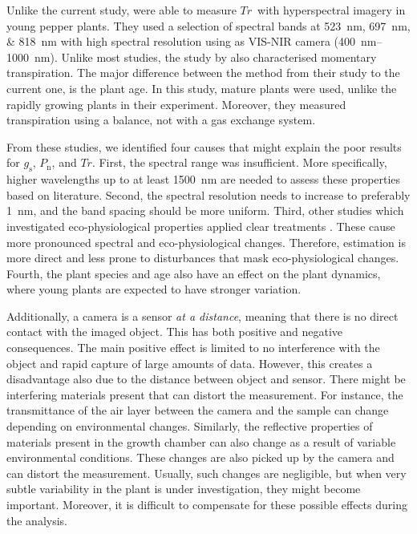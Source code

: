 \documentclass[10pt,authoryear,a4paper]{elsarticle}
\newcommand{\Cond}{$g_\text{s}$}
\newcommand{\Photo}{$P_\text{n}$}
\newcommand{\Transp}{$Tr$}
\begin{document}
    Unlike the current study, \citet{wekslerHyperspectralPhysiological2020} were able to measure \Transp\ with hyperspectral imagery in young pepper plants. They used a selection of spectral bands at \SIlist{523;697;818}{\nano\metre} with high spectral resolution using as VIS-NIR camera (\SIrange{400}{1000}{\nano\metre}). Unlike most studies, the study by \citet{wekslerHyperspectralPhysiological2020} also characterised momentary transpiration. The major difference between the method from their study to the current one, is the plant age. In this study, mature plants were used, unlike the rapidly growing plants in their experiment. Moreover, they measured transpiration using a balance, not with a gas exchange system. 
    
    From these studies, we identified four causes that might explain the poor results for \Cond, \Photo, and \Transp. First, the spectral range was insufficient. More specifically, higher wavelengths up to at least \SI{1500}{\nano\metre} are needed to assess these properties based on literature. Second, the spectral resolution needs to increase to preferably \SI{1}{\nano\metre}, and the band spacing should be more uniform. Third, other studies which investigated eco-physiological properties applied clear treatments \citep{zhaoNitrogen2005,zarco-tejadaSpatiotemporal2013,behmannDetection2014,silva-perezHyperspectral2018}. These cause more pronounced spectral and eco-physiological changes. Therefore, estimation is more direct and less prone to disturbances that mask eco-physiological changes. Fourth, the plant species and age also have an effect on the plant dynamics, where young plants are expected to have stronger variation.
    
    Additionally, a camera is a sensor \emph{at a distance}, meaning that there is no direct contact with the imaged object. This has both positive and negative consequences. The main positive effect is limited to no interference with the object and rapid capture of large amounts of data. However, this creates a disadvantage also due to the distance between object and sensor. There might be interfering materials present that can distort the measurement. For instance, the transmittance of the air layer between the camera and the sample can change depending on environmental changes. Similarly, the reflective properties of materials present in the growth chamber can also change as a result of variable environmental conditions. These changes are also picked up by the camera and can distort the measurement. Usually, such changes are negligible, but when very subtle variability in the plant is under investigation, they might become important.  Moreover, it is difficult to compensate for these possible effects during the analysis.
    
\end{document}
